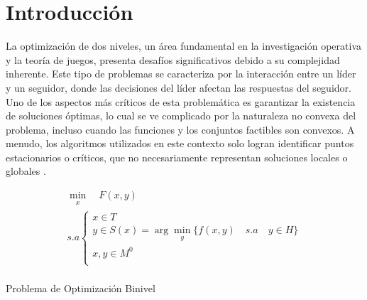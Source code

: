 \chapter{Introducción}
La optimización de dos niveles, un área fundamental en la investigación operativa y la teoría de juegos, presenta desafíos significativos debido a su complejidad inherente. Este tipo de problemas se caracteriza por la interacción entre un líder y un seguidor, donde las decisiones del líder afectan las respuestas del seguidor. Uno de los aspectos más críticos de esta problemática es garantizar la existencia de soluciones óptimas, lo cual se ve complicado por la naturaleza no convexa del problema, incluso cuando las funciones y los conjuntos factibles son convexos. A menudo, los algoritmos utilizados en este contexto solo logran identificar puntos estacionarios o críticos, que no necesariamente representan soluciones locales o globales \cite{DempeyZemkoho2020}.


\begin{table}[H]

    \[\begin{array}{l}
        \underset{\substack{x}}{\min} \quad F(x, y)\\
        s.a \left\{ \begin{array}{l}
            x \in T \\
             y \in S(x) = \arg  \underset{\substack{y}}{\min} \{ f(x, y) \quad s.a \quad y \in  H \}\\
            x,y \in M^0 \\
        \end{array}\right.
        \tag{\theequation}
        \label{eq:Def1Binivel}
    \end{array}\]\\


    \caption*{Problema de Optimización Binivel}
    \end{table}

